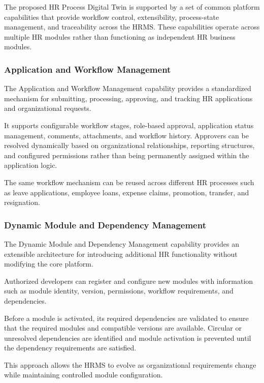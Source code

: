 \documentclass[12pt,a4paper]{article}
\begin{document}
The proposed HR Process Digital Twin is supported by a set of
common platform capabilities that provide workflow control,
extensibility, process-state management, and traceability across
the HRMS. These capabilities operate across multiple HR modules
rather than functioning as independent HR business modules.

\subsubsection{Application and Workflow Management}

The Application and Workflow Management capability provides a
standardized mechanism for submitting, processing, approving, and
tracking HR applications and organizational requests.

It supports configurable workflow stages, role-based approval,
application status management, comments, attachments, and
workflow history. Approvers can be resolved dynamically based on
organizational relationships, reporting structures, and configured
permissions rather than being permanently assigned within the
application logic.

The same workflow mechanism can be reused across different HR
processes such as leave applications, employee loans, expense
claims, promotion, transfer, and resignation.

\subsubsection{Dynamic Module and Dependency Management}

The Dynamic Module and Dependency Management capability provides
an extensible architecture for introducing additional HR
functionality without modifying the core platform.

Authorized developers can register and configure new modules with
information such as module identity, version, permissions,
workflow requirements, and dependencies.

Before a module is activated, its required dependencies are
validated to ensure that the required modules and compatible
versions are available. Circular or unresolved dependencies are
identified and module activation is prevented until the dependency
requirements are satisfied.

This approach allows the HRMS to evolve as organizational
requirements change while maintaining controlled module
configuration.
\end{document}
